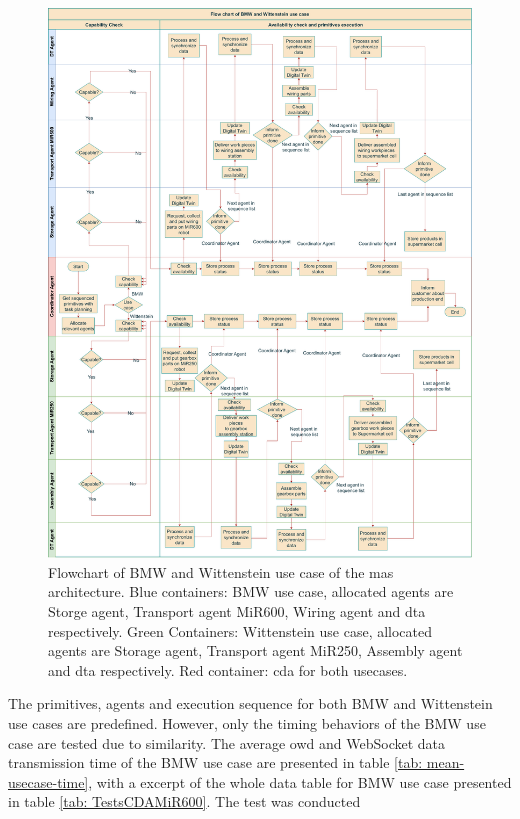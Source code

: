 \begin{figure}[htb]
    \includegraphics[width=\textwidth]{figures/tests/usecase/Usecase_flow.pdf}\hfill 
    \caption{Flowchart of BMW and Wittenstein use case of the \gls{mas} architecture. 
    Blue containers: BMW use case, allocated agents are Storge agent, 
    Transport agent MiR600, Wiring agent and \gls{dta} respectively. 
    Green Containers: Wittenstein use case, allocated agents are Storage agent, 
    Transport agent MiR250, Assembly agent and \gls{dta} respectively. 
    Red container: \gls{cda} for both usecases.} 
    \label{fig: Flowchart-usecase}
\end{figure}
The primitives, agents and execution sequence for both BMW and Wittenstein use cases 
are predefined. However, only the timing behaviors of the BMW use case are tested due 
to similarity. The average \gls{owd} and WebSocket data transmission time of the BMW 
use case are presented in table \ref{tab: mean-usecase-time}, with a excerpt of the whole 
data table for BMW use case presented in table \ref{tab: TestsCDAMiR600}. The test was conducted 
